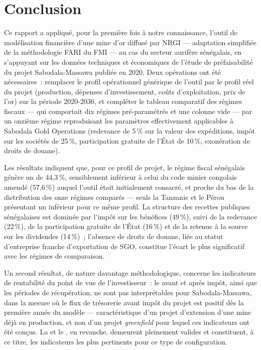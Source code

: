 \chapter*{Conclusion}

Ce rapport a appliqué, pour la première fois à notre connaissance, l'outil de modélisation financière d'une mine d'or diffusé par NRGI --- adaptation simplifiée de la méthodologie FARI du FMI --- au cas du secteur aurifère sénégalais, en s'appuyant sur les données techniques et économiques de l'étude de préfaisabilité du projet Sabodala-Massawa publiée en 2020. Deux opérations ont été nécessaires~: remplacer le profil opérationnel générique de l'outil par le profil réel du projet (production, dépenses d'investissement, coûts d'exploitation, prix de l'or) sur la période 2020-2036, et compléter le tableau comparatif des régimes fiscaux --- qui comportait dix régimes pré-paramétrés et une colonne vide --- par un onzième régime reproduisant les paramètres effectivement applicables à Sabodala Gold Operations (redevance de 5\,\% sur la valeur des expéditions, impôt sur les sociétés de 25\,\%, participation gratuite de l'État de 10\,\%, exonération de droits de douane).

Les résultats indiquent que, pour ce profil de projet, le régime fiscal sénégalais génère un \TEMI{} de 44,3\,\%, sensiblement inférieur à celui du code minier congolais amendé (57,6\,\%) auquel l'outil était initialement consacré, et proche du bas de la distribution des onze régimes comparés --- seuls la Tanzanie et le Pérou présentant un \TEMI{} inférieur pour ce même profil. La structure des recettes publiques sénégalaises est dominée par l'impôt sur les bénéfices (49\,\%), suivi de la redevance (22\,\%), de la participation gratuite de l'État (16\,\%) et de la retenue à la source sur les dividendes (14\,\%)~; l'absence de droits de douane, liée au statut d'entreprise franche d'exportation de SGO, constitue l'écart le plus significatif avec les régimes de comparaison.

Un second résultat, de nature davantage méthodologique, concerne les indicateurs de rentabilité du point de vue de l'investisseur~: le \TRI{} avant et après impôt, ainsi que les périodes de récupération, ne sont pas interprétables pour Sabodala-Massawa, dans la mesure où le flux de trésorerie avant impôt du projet est positif dès la première année du modèle --- caractéristique d'un projet d'extension d'une mine déjà en production, et non d'un projet \emph{greenfield} pour lequel ces indicateurs ont été conçus. La \VAN{} et le \TEMI, en revanche, demeurent pleinement valides et constituent, à ce titre, les indicateurs les plus pertinents pour ce type de configuration.

